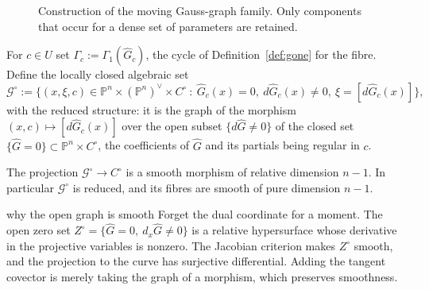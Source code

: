 \documentclass[acmsmall,screen,nonacm]{acmart}
\theoremstyle{definition}
\theoremstyle{remark}
\newcommand{\PP}{\mathbb{P}}
\newcommand{\Gfam}{\mathcal{G}}
\newcommand{\Gone}{\Gamma_{\!1}}
\begin{document}
\begin{figure}[h]
\centering
{}
\caption{Construction of the moving Gauss-graph family.  Only components that occur for a dense set of parameters are retained.}
\label{fig:family-construction}
\end{figure}

For $c\in U$ set $\Gamma_c:=\Gone(\widehat G_c)$, the cycle of
Definition~\ref{def:gone} for the fibre.  Define the locally closed
algebraic set
\[
  \Gfam^\circ:=\big\{(x,\xi,c)\in
  \PP^n\times(\PP^n)^\vee\times C^\circ\ :\
  \widehat G_c(x)=0,\ d\widehat G_c(x)\ne0,\
  \xi=[d\widehat G_c(x)]\big\},
\]
with the reduced structure: it is the graph of the morphism
$(x,c)\mapsto[d\widehat G_c(x)]$ over the open subset
$\{d\widehat G\ne0\}$ of the closed set
$\{\widehat G=0\}\subset\PP^n\times C^\circ$, the coefficients of
$\widehat G$ and its partials being regular in $c$.

\begin{lemma}
\label{lem:smoothgraph}
The projection $\Gfam^\circ\to C^\circ$ is a smooth morphism of
relative dimension $n-1$.  In particular $\Gfam^\circ$ is reduced, and
its fibres are smooth of pure dimension $n-1$.
\end{lemma}

\begin{roadmapbox}{why the open graph is smooth}
Forget the dual coordinate for a moment.  The open zero set
$Z^\circ=\{\widehat G=0,\ d_x\widehat G\ne0\}$ is a relative
hypersurface whose derivative in the projective variables is nonzero.  The
Jacobian criterion makes $Z^\circ$ smooth, and the projection to the curve has
surjective differential.  Adding the tangent covector is merely taking the
graph of a morphism, which preserves smoothness.
\end{roadmapbox}
\end{document}
